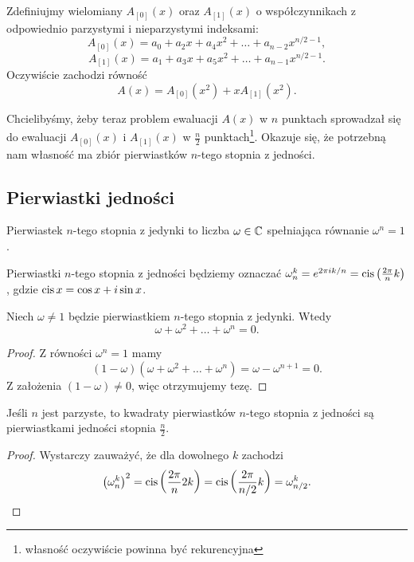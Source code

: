 \documentclass[11pt]{scrartcl}
\begin{document}
    Zdefiniujmy wielomiany $A_{[0]}(x)$ oraz $A_{[1]}(x)$ o współczynnikach z odpowiednio parzystymi i nieparzystymi indeksami:
    $$ A_{[0]}(x) = a_0 + a_2x + a_4x^2 + \ldots + a_{n-2}x^{n/2 - 1}, $$
    $$ A_{[1]}(x) = a_1 + a_3x + a_5x^2 + \ldots + a_{n-1}x^{n/2 - 1}. $$
    Oczywiście zachodzi równość
    \begin{equation}
        A(x) = A_{[0]}(x^2) + xA_{[1]}(x^2).
    \end{equation}

    Chcielibyśmy, żeby teraz problem ewaluacji $A(x)$ w $n$ punktach sprowadzał się do ewaluacji $A_{[0]}(x)$ i $A_{[1]}(x)$ w $\frac{n}{2}$ punktach\footnote{własność oczywiście powinna być rekurencyjna}. Okazuje się, że potrzebną nam własność ma zbiór pierwiastków $n$-tego stopnia z jedności.

    \subsection{Pierwiastki jedności}
    \begin{definition}
        Pierwiastek $n$-tego stopnia z jedynki to liczba $\omega \in \mathbb C$ spełniająca równanie $\omega^n = 1$.
    \end{definition}

    Pierwiastki $n$-tego stopnia z jedności będziemy oznaczać $\omega_n^k = e^{2\pi i k/n} = \operatorname{cis}\left(\frac{2\pi}{n}k\right)$, gdzie $\operatorname{cis}{x} = \cos{x} + i\sin{x}$.

    \begin{lemma}
        \label{l:roots_sum}
        Niech $\omega \neq 1$ będzie pierwiastkiem $n$-tego stopnia z jedynki. Wtedy
        $$ \omega + \omega^2 + \ldots + \omega^n = 0. $$
    \end{lemma}
    \begin{proof}
        Z równości $\omega^n = 1$ mamy
        $$ (1 - \omega)(\omega + \omega^2 + \ldots + \omega^n) = \omega - \omega^{n+1} = 0. $$
        Z założenia $(1 - \omega) \neq 0$, więc otrzymujemy tezę.
    \end{proof}

    \begin{lemma}[o redukcji]
        \label{l:reduction}
        Jeśli $n$ jest parzyste, to kwadraty pierwiastków $n$-tego stopnia z jedności są pierwiastkami jedności stopnia $\frac{n}{2}$.
    \end{lemma}
    \begin{proof}
        Wystarczy zauważyć, że dla dowolnego $k$ zachodzi
        $$ \left(\omega_n^k\right)^2 = \operatorname{cis}\left(\frac{2\pi}{n}2k\right) = \operatorname{cis}\left(\frac{2\pi}{n/2}k\right) = \omega_{n/2}^k. $$
    \end{proof}
\end{document}
